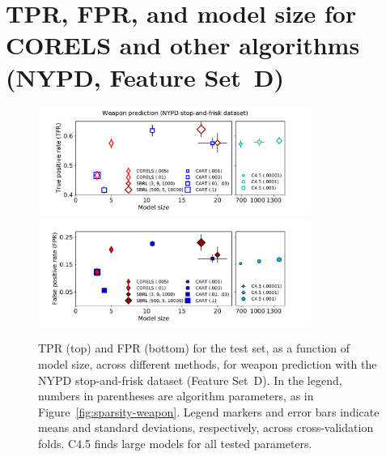 \clearpage
\section{TPR, FPR, and model size for CORELS and other algorithms (NYPD, Feature Set~D)}
\label{appendix:cpw}

\begin{figure}[htb!]
\begin{center}
\includegraphics[trim={17mm, 0mm, 27mm, 0mm},
width=0.8\textwidth]{figs/cpw-noloc-sparsity-tpr.pdf}
\includegraphics[trim={17mm, 10mm, 27mm, 4mm},
width=0.8\textwidth]{figs/cpw-noloc-sparsity-fpr.pdf}
\end{center}
\caption{TPR (top) and FPR (bottom)
for the test set, as a function of model size, across different methods,
for weapon prediction with the NYPD stop-and-frisk dataset (Feature Set~D).
%
In the legend, numbers in parentheses are algorithm parameters,
as in Figure~\ref{fig:sparsity-weapon}.
%
Legend markers and error bars indicate means and standard deviations,
respectively, across cross-validation folds.
%
%
C4.5 finds large models for all tested parameters.
}
\label{fig:sparsity-cpw}
\end{figure}

